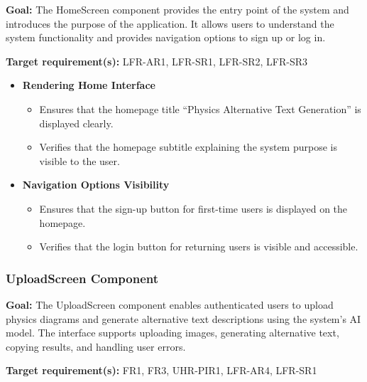 \documentclass[12pt, titlepage]{article}
\begin{document}
\textbf{Goal:} The HomeScreen component provides the entry point of the system and introduces the purpose of the application. It allows users to understand the system functionality and provides navigation options to sign up or log in.

\textbf{Target requirement(s):} LFR-AR1, LFR-SR1, LFR-SR2, LFR-SR3

\begin{itemize}

\item \textbf{Rendering Home Interface}

\begin{itemize}
\item Ensures that the homepage title ``Physics Alternative Text Generation'' is displayed clearly.
\item Verifies that the homepage subtitle explaining the system purpose is visible to the user.
\end{itemize}

\item \textbf{Navigation Options Visibility}

\begin{itemize}
\item Ensures that the sign-up button for first-time users is displayed on the homepage.
\item Verifies that the login button for returning users is visible and accessible.
\end{itemize}

\end{itemize}



\subsubsection{UploadScreen Component}

\textbf{Goal:} The UploadScreen component enables authenticated users to upload physics diagrams and generate alternative text descriptions using the system’s AI model. The interface supports uploading images, generating alternative text, copying results, and handling user errors.

\textbf{Target requirement(s):} FR1, FR3, UHR-PIR1, LFR-AR4, LFR-SR1
\end{document}
